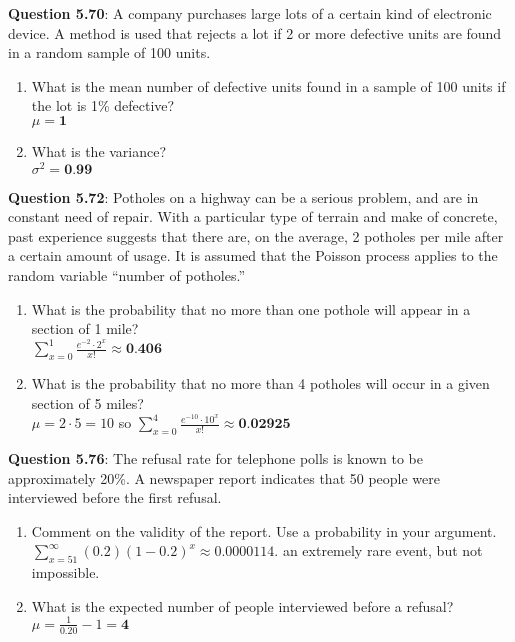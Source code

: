 \documentclass{article}
\begin{document}
    \textbf{Question 5.70}: A company purchases large lots of a certain kind
    of electronic device. A method is used that rejects a
    lot if 2 or more defective units are found in a random
    sample of 100 units.
        \begin{enumerate}[label = (\alph*)]
            \item What is the mean number of defective units found
            in a sample of 100 units if the lot is 1\% defective?\\
                $\mu = \textbf{1}$
            \item What is the variance?\\
                $\sigma^2 = \textbf{0.99}$
        \end{enumerate}
    \textbf{Question 5.72}:  Potholes on a highway can be a serious problem,
    and are in constant need of repair. With a particular
    type of terrain and make of concrete, past experience
    suggests that there are, on the average, 2 potholes per
    mile after a certain amount of usage. It is assumed
    that the Poisson process applies to the random variable 
    “number of potholes.”
        \begin{enumerate}[label = (\alph*)]
            \item What is the probability that no more than one pothole will appear in a section of 1 mile?\\
            $\sum_{x=0}^{1}\frac{e^{-2}\cdot 2^x}{x!} \approx \textbf{0.406}$
            \item What is the probability that no more than 4 potholes will occur in a given section of 5 miles?\\
            $\mu = 2\cdot 5 = 10$ so $\sum_{x=0}^{4}\frac{e^{-10}\cdot 10^x}{x!} \approx \textbf{0.02925}$
        \end{enumerate}
    \textbf{Question 5.76}: The refusal rate for telephone polls is known to
    be approximately 20\%. A newspaper report indicates
    that 50 people were interviewed before the first refusal.
        \begin{enumerate}[label = (\alph*)]
            \item Comment on the validity of the report. Use a probability in your argument.\\
            $\sum_{x=51}^{\infty}(0.2)(1-0.2)^x \approx 0.0000114$. an extremely rare event, but not impossible.
            \item What is the expected number of people interviewed
            before a refusal?\\
            $\mu = \frac{1}{0.20}-1 = \textbf{4}$
        \end{enumerate}
\end{document}
